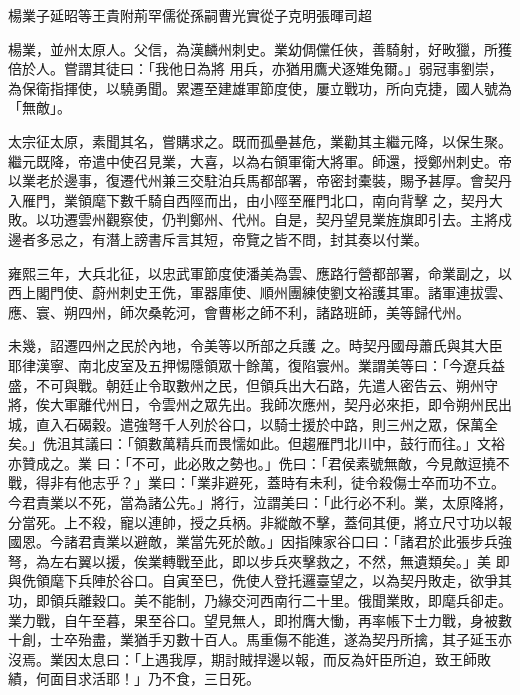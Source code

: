 
\begin{pinyinscope}

 楊業子延昭等王貴附荊罕儒從孫嗣曹光實從子克明張暉司超



 楊業，並州太原人。父信，為漢麟州刺史。業幼倜儻任俠，善騎射，好畋獵，所獲倍於人。嘗謂其徒曰：「我他日為將
 用兵，亦猶用鷹犬逐雉兔爾。」弱冠事劉崇，為保衛指揮使，以驍勇聞。累遷至建雄軍節度使，屢立戰功，所向克捷，國人號為「無敵」。



 太宗征太原，素聞其名，嘗購求之。既而孤壘甚危，業勸其主繼元降，以保生聚。繼元既降，帝遣中使召見業，大喜，以為右領軍衛大將軍。師還，授鄭州刺史。帝以業老於邊事，復遷代州兼三交駐泊兵馬都部署，帝密封橐裝，賜予甚厚。會契丹入雁門，業領麾下數千騎自西陘而出，由小陘至雁門北口，南向背擊
 之，契丹大敗。以功遷雲州觀察使，仍判鄭州、代州。自是，契丹望見業旌旗即引去。主將戍邊者多忌之，有潛上謗書斥言其短，帝覽之皆不問，封其奏以付業。



 雍熙三年，大兵北征，以忠武軍節度使潘美為雲、應路行營都部署，命業副之，以西上閣門使、蔚州刺史王侁，軍器庫使、順州團練使劉文裕護其軍。諸軍連拔雲、應、寰、朔四州，師次桑乾河，會曹彬之師不利，諸路班師，美等歸代州。



 未幾，詔遷四州之民於內地，令美等以所部之兵護
 之。時契丹國母蕭氏與其大臣耶律漢寧、南北皮室及五押惕隱領眾十餘萬，復陷寰州。業謂美等曰：「今遼兵益盛，不可與戰。朝廷止令取數州之民，但領兵出大石路，先遣人密告云、朔州守將，俟大軍離代州日，令雲州之眾先出。我師次應州，契丹必來拒，即令朔州民出城，直入石碣穀。遣強弩千人列於谷口，以騎士援於中路，則三州之眾，保萬全矣。」侁沮其議曰：「領數萬精兵而畏懦如此。但趨雁門北川中，鼓行而往。」文裕亦贊成之。業
 曰：「不可，此必敗之勢也。」侁曰：「君侯素號無敵，今見敵逗撓不戰，得非有他志乎？」業曰：「業非避死，蓋時有未利，徒令殺傷士卒而功不立。今君責業以不死，當為諸公先。」將行，泣謂美曰：「此行必不利。業，太原降將，分當死。上不殺，寵以連帥，授之兵柄。非縱敵不擊，蓋伺其便，將立尺寸功以報國恩。今諸君責業以避敵，業當先死於敵。」因指陳家谷口曰：「諸君於此張步兵強弩，為左右翼以援，俟業轉戰至此，即以步兵夾擊救之，不然，無遺類矣。」美
 即與侁領麾下兵陣於谷口。自寅至巳，侁使人登托邏臺望之，以為契丹敗走，欲爭其功，即領兵離穀口。美不能制，乃緣交河西南行二十里。俄聞業敗，即麾兵卻走。業力戰，自午至暮，果至谷口。望見無人，即拊膺大慟，再率帳下士力戰，身被數十創，士卒殆盡，業猶手刃數十百人。馬重傷不能進，遂為契丹所擒，其子延玉亦沒焉。業因太息曰：「上遇我厚，期討賊捍邊以報，而反為奸臣所迫，致王師敗績，何面目求活耶！」乃不食，三日死。




\end{pinyinscope}
